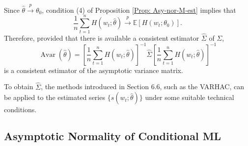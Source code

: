 Since $\hat{\theta} \stackrel{p}{\rightarrow} \theta_0$, condition (4) of Proposition \ref{Prop: Asy-nor-M-est} implies that
\[
\frac{1}{n} \sum_{t=1}^n H(w_t; \hat{\theta}) \xrightarrow{p} \mathbb{E}[H(w_t; \theta_0)].
\]
Therefore, provided that there is available a consistent estimator $\hat{\Sigma}$ of $\Sigma$,
\[
\operatorname{Avar}(\hat{\theta}) = \left[ \frac{1}{n} \sum_{t=1}^n H(w_t; \hat{\theta}) \right]^{-1} \hat{\Sigma} \left[ \frac{1}{n} \sum_{t=1}^n H(w_t; \hat{\theta}) \right]^{-1}
\]
is a consistent estimator of the asymptotic variance matrix. 

To obtain $\hat{\Sigma}$, the methods introduced in Section 6.6, 
such as the VARHAC, can be applied to the estimated series $\{s(w_t; \hat{\theta})\}$ under some suitable technical conditions.

\subsection{Asymptotic Normality of Conditional ML}